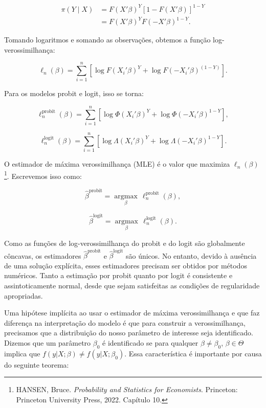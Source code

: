 \documentclass[12pt, a4paper, openany]{book}
\numberwithin{equation}{chapter}
\numberwithin{table}{chapter}
\numberwithin{figure}{chapter}
\theoremstyle{break}
\begin{document}
\begin{align*}
    \pi(Y \mid {X}) &= F({X}'{\beta})^{Y} \left[1 - F({X}'{\beta})\right]^{1 - Y} \\
                           &= F({X}'{\beta})^{Y} F(-{X}'{\beta})^{1 - Y}.
\end{align*}

Tomando logaritmos e somando as observações, obtemos a função log-verossimilhança:

\[
\ell_n({\beta}) = \sum_{i=1}^{n} \left[  \log F({X}_i'{\beta})^Y +  \log F(-{X}_i'{\beta})^{(1 - Y)} \right].
\]

Para os modelos probit e logit, isso se torna:

\[
\ell_n^{\text{probit}}({\beta}) = \sum_{i=1}^{n} \left[  \log \Phi({X}_i'{\beta})^Y + \log \Phi(-{X}_i'{\beta})^{1-Y} \right],
\]

\[
\ell_n^{\text{logit}}({\beta}) = \sum_{i=1}^{n} \left[ \log \Lambda({X}_i'{\beta})^Y +  \log \Lambda(-{X}_i'{\beta})^{1-Y} \right].
\]

O estimador de máxima verossimilhança (MLE) é o valor que maximiza \( \ell_n({\beta}) \)\footnote{HANSEN, Bruce. \textit{Probability and Statistics for Economists}. Princeton: Princeton University Press, 2022. Capítulo 10.}. Escrevemos isso como:

\[
\hat{{\beta}}^{\text{probit}} = \underset{{\beta}}{\operatorname{argmax}} \, \ell_n^{\text{probit}}({\beta}),
\]

\[
\hat{{\beta}}^{\text{logit}} = \underset{{\beta}}{\operatorname{argmax}} \, \ell_n^{\text{logit}}({\beta}).
\]

Como as funções de log-verossimilhança do probit e do logit são globalmente côncavas, os estimadores \( \hat{{\beta}}^{\text{probit}} \) e \( \hat{{\beta}}^{\text{logit}} \) são únicos. No entanto, devido à ausência de uma solução explícita, esses estimadores precisam ser obtidos por métodos numéricos. Tanto a estimação por probit quanto por logit é consistente e assintoticamente normal, desde que sejam satisfeitas as condições de regularidade apropriadas.





Uma hipótese implícita ao usar o estimador de máxima verossimilhança e que faz diferença na interpretação do modelo é que para construir a verossimilhança, precisamos que a distribuição do nosso parâmetro de interesse seja identificado. Dizemos que um parâmetro \(\beta_0\) é identificado se para qualquer \(\beta \neq \beta_0\), \(\beta \in \Theta\) implica que \(f(y | X; \beta) \neq f(y | X; \beta_0)\). Essa característica é importante por causa do seguinte teorema:
\end{document}
